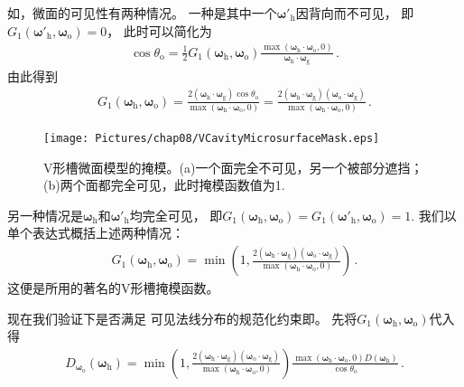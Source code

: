 如，微面的可见性有两种情况。
一种是其中一个${\bm\omega}'_{\mathrm{h}}$因背向而不可见，
即$G_1({\bm\omega}'_{\mathrm{h}},{\bm\omega}_{\mathrm{o}})=0$，
此时可以简化为
\begin{align}
    \cos\theta_{\mathrm{o}}=\frac{1}{2}G_1({\bm\omega}_{\mathrm{h}},{\bm\omega}_{\mathrm{o}})
    \frac{\max({\bm\omega}_{\mathrm{h}}\cdot{\bm\omega}_{\mathrm{o}},0)}
    {{\bm\omega}_{\mathrm{h}}\cdot{\bm\omega}_{\mathrm{g}}}\, .
\end{align}
由此得到
\begin{align}
    G_1({\bm\omega}_{\mathrm{h}},{\bm\omega}_{\mathrm{o}})
    =\frac{2({\bm\omega}_{\mathrm{h}}\cdot{\bm\omega}_{\mathrm{g}})\cos\theta_{\mathrm{o}}}
    {\max({\bm\omega}_{\mathrm{h}}\cdot{\bm\omega}_{\mathrm{o}},0)}
    =\frac{2({\bm\omega}_{\mathrm{h}}\cdot{\bm\omega}_{\mathrm{g}})
    ({\bm\omega}_{\mathrm{o}}\cdot{\bm\omega}_{\mathrm{g}})}
    {\max({\bm\omega}_{\mathrm{h}}\cdot{\bm\omega}_{\mathrm{o}},0)}\, .
\end{align}

\begin{figure}[htbp]
    \centering
    \texttt{[image: Pictures/chap08/VCavityMicrosurfaceMask.eps]}
    \caption{V形槽微面模型的掩模。(a)一个面完全不可见，另一个被部分遮挡；
        (b)两个面都完全可见，此时掩模函数值为1.}
    \label{fig:08ex01-V-cavityScattering-Mask}
\end{figure}

另一种情况是${\bm\omega}_{\mathrm{h}}$和${\bm\omega}'_{\mathrm{h}}$均完全可见，
即$G_1({\bm\omega}_{\mathrm{h}},{\bm\omega}_{\mathrm{o}})=G_1({\bm\omega}'_{\mathrm{h}},{\bm\omega}_{\mathrm{o}})=1$.
我们以单个表达式概括上述两种情况：
\begin{align}\label{eq:08ex01-V-Cavity-MaskingFunction}
    G_1({\bm\omega}_{\mathrm{h}},{\bm\omega}_{\mathrm{o}})
    =\min\left(1, \frac{2({\bm\omega}_{\mathrm{h}}\cdot{\bm\omega}_{\mathrm{g}})
    ({\bm\omega}_{\mathrm{o}}\cdot{\bm\omega}_{\mathrm{g}})}
    {\max({\bm\omega}_{\mathrm{h}}\cdot{\bm\omega}_{\mathrm{o}},0)}\right)\, .
\end{align}
这便是\citet{10.1145/357290.357293}所用的著名的V形槽掩模函数。

现在我们验证下是否满足
可见法线分布的规范化约束即。
先将$G_1({\bm\omega}_{\mathrm{h}},{\bm\omega}_{\mathrm{o}})$代入得
\begin{align}
    D_{{\bm\omega}_{\mathrm{o}}}({\bm\omega}_{\mathrm{h}})
    =\min\left(1, \frac{2({\bm\omega}_{\mathrm{h}}\cdot{\bm\omega}_{\mathrm{g}})
    ({\bm\omega}_{\mathrm{o}}\cdot{\bm\omega}_{\mathrm{g}})}
    {\max({\bm\omega}_{\mathrm{h}}\cdot{\bm\omega}_{\mathrm{o}},0)}\right)
    \frac{\max({\bm\omega}_{\mathrm{h}}\cdot{\bm\omega}_{\mathrm{o}},0)
        D({\bm\omega}_{\mathrm{h}})}{\cos\theta_{\mathrm{o}}}\, .
\end{align}

